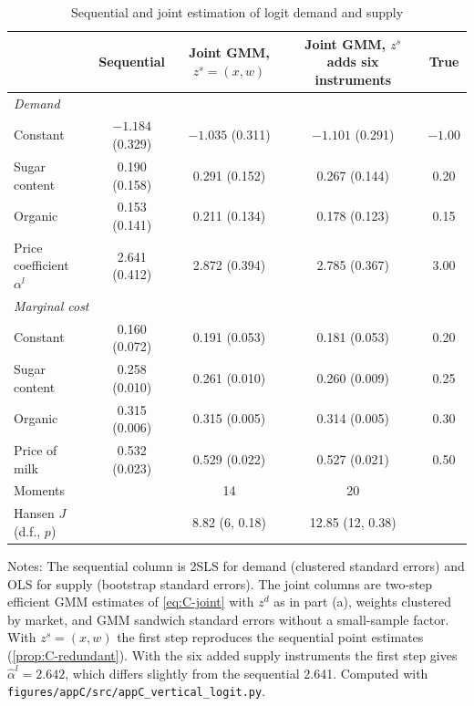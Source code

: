 \begin{table}[htbp]
\centering
\caption{Sequential and joint estimation of logit demand and supply}
\label{tab:C-joint}
\small
\begin{tabular}{@{}lcccc@{}}
\toprule
 & Sequential & \makecell{Joint GMM,\\ $z^s = (x, w)$} & \makecell{Joint GMM, $z^s$ adds\\ six instruments}
 & True \\
\midrule
\multicolumn{5}{l}{\textit{Demand}} \\
Constant & $-1.184$ (0.329) & $-1.035$ (0.311) & $-1.101$ (0.291) & $-1.00$ \\
Sugar content & 0.190 (0.158) & 0.291 (0.152) & 0.267 (0.144) & 0.20 \\
Organic & 0.153 (0.141) & 0.211 (0.134) & 0.178 (0.123) & 0.15 \\
Price coefficient $\alpha^l$ & 2.641 (0.412) & 2.872 (0.394) & 2.785 (0.367) & 3.00 \\
\multicolumn{5}{l}{\textit{Marginal cost}} \\
Constant & 0.160 (0.072) & 0.191 (0.053) & 0.181 (0.053) & 0.20 \\
Sugar content & 0.258 (0.010) & 0.261 (0.010) & 0.260 (0.009) & 0.25 \\
Organic & 0.315 (0.006) & 0.315 (0.005) & 0.314 (0.005) & 0.30 \\
Price of milk & 0.532 (0.023) & 0.529 (0.022) & 0.527 (0.021) & 0.50 \\
\midrule
Moments & & 14 & 20 & \\
Hansen $J$ (d.f., $p$) & & 8.82 (6, 0.18) & 12.85 (12, 0.38) & \\
\bottomrule
\end{tabular}

\vspace{3pt}
\begin{minipage}{0.97\textwidth}
\footnotesize Notes: The sequential column is 2SLS for demand (clustered standard errors) and OLS
for supply (bootstrap standard errors). The joint columns are two-step efficient GMM estimates of \eqref{eq:C-joint} with
$z^d$ as in part (a), weights clustered by market, and GMM sandwich standard errors without a small-sample factor. With
$z^s = (x, w)$ the first step reproduces the sequential point estimates (\cref{prop:C-redundant}). With the six added
supply instruments the first step gives $\hat\alpha^l = 2.642$, which differs slightly from the sequential 2.641.
Computed with \texttt{figures/appC/src/appC\_vertical\_logit.py}.
\end{minipage}
\end{table}

